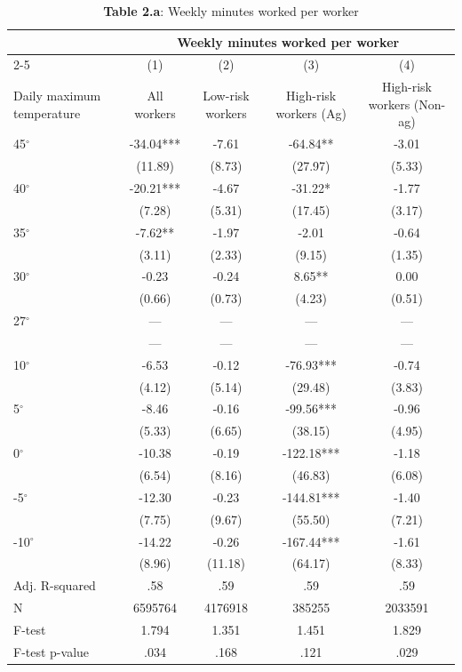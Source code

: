\begin{table}[H]
\centering
\caption{\textbf{Table 2.a}: Weekly minutes worked per worker}
\begin{tabular}{lcccc}
\hline\hline
 & \multicolumn{4}{c}{Weekly minutes worked per worker} \\
\cline{2-5}
 & (1) & (2) & (3) & (4) \\
Daily maximum temperature & All workers & Low-risk workers & High-risk workers (Ag) & High-risk workers (Non-ag) \\
\hline
45$^\circ$ & -34.04*** & -7.61 & -64.84** & -3.01 \\
 & (11.89) & (8.73) & (27.97) & (5.33) \\
40$^\circ$ & -20.21*** & -4.67 & -31.22* & -1.77 \\
 & (7.28) & (5.31) & (17.45) & (3.17) \\
35$^\circ$ & -7.62** & -1.97 & -2.01 & -0.64 \\
 & (3.11) & (2.33) & (9.15) & (1.35) \\
30$^\circ$ & -0.23 & -0.24 & 8.65** & 0.00 \\
 & (0.66) & (0.73) & (4.23) & (0.51) \\
27$^\circ$ & --- & --- & --- & --- \\
 & --- & --- & --- & --- \\
10$^\circ$ & -6.53 & -0.12 & -76.93*** & -0.74 \\
 & (4.12) & (5.14) & (29.48) & (3.83) \\
5$^\circ$ & -8.46 & -0.16 & -99.56*** & -0.96 \\
 & (5.33) & (6.65) & (38.15) & (4.95) \\
0$^\circ$ & -10.38 & -0.19 & -122.18*** & -1.18 \\
 & (6.54) & (8.16) & (46.83) & (6.08) \\
-5$^\circ$ & -12.30 & -0.23 & -144.81*** & -1.40 \\
 & (7.75) & (9.67) & (55.50) & (7.21) \\
-10$^\circ$ & -14.22 & -0.26 & -167.44*** & -1.61 \\
 & (8.96) & (11.18) & (64.17) & (8.33) \\
\hline
Adj. R-squared & .58 & .59 & .59 & .59 \\
N & 6595764 & 4176918 & 385255 & 2033591 \\
F-test & 1.794 & 1.351 & 1.451 & 1.829 \\
F-test p-value & .034 & .168 & .121 & .029 \\
\hline\hline
\end{tabular}
\end{table}
